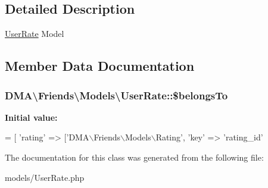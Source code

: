 \subsection{Detailed Description}
\hyperlink{classDMA_1_1Friends_1_1Models_1_1UserRate}{User\+Rate} Model 

\subsection{Member Data Documentation}
\hypertarget{classDMA_1_1Friends_1_1Models_1_1UserRate_ac465be6b648764f7b010de22878e10a1}{}
\subsubsection[{\$belongs\+To}]{\setlength{\rightskip}{0pt plus 5cm}D\+M\+A\textbackslash{}\+Friends\textbackslash{}\+Models\textbackslash{}\+User\+Rate\+::\$belongs\+To}\label{classDMA_1_1Friends_1_1Models_1_1UserRate_ac465be6b648764f7b010de22878e10a1}
{\bfseries Initial value\+:}
\begin{DoxyCode}
= [
        \textcolor{stringliteral}{'rating'} => [\textcolor{stringliteral}{'DMA\(\backslash\)Friends\(\backslash\)Models\(\backslash\)Rating'},
                \textcolor{stringliteral}{'key'} => \textcolor{stringliteral}{'rating\_id'}
\end{DoxyCode}


The documentation for this class was generated from the following file\+:\begin{DoxyCompactItemize}
\item 
models/User\+Rate.\+php\end{DoxyCompactItemize}
